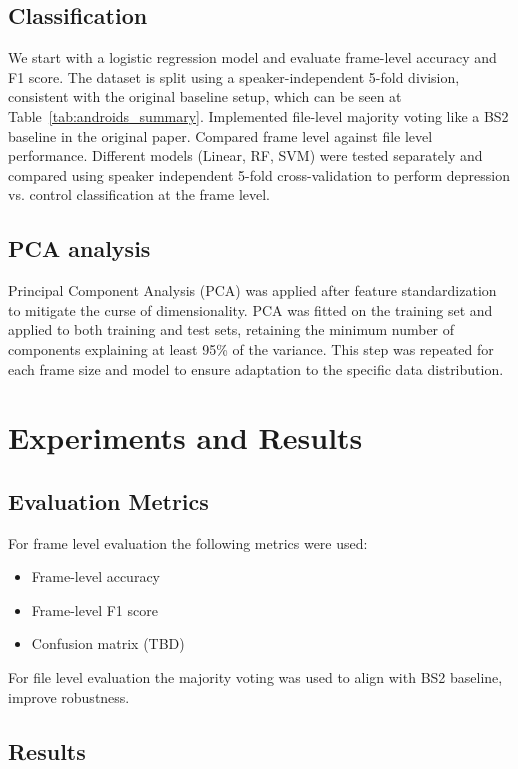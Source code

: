 \documentclass[conference]{IEEEtran}
\begin{document}
\subsection{Classification}
We start with a logistic regression model and evaluate frame-level accuracy and F1 score. 
The dataset is split using a speaker-independent 5-fold division, consistent with the original baseline setup, which can be seen at Table~\ref{tab:androids_summary}.
Implemented file-level majority voting like a BS2 baseline in the original paper.
Compared frame level against file level performance.
Different models (Linear, RF, SVM) were tested separately and compared using speaker independent 5-fold cross-validation 
to perform depression vs. control classification at the frame level.

\subsection{PCA analysis}

Principal Component Analysis (PCA) was applied after feature standardization to mitigate the curse of dimensionality. 
PCA was fitted on the training set and applied to both training and test sets, retaining the minimum number of components explaining at least 95\% of the variance. 
This step was repeated for each frame size and model to ensure adaptation to the specific data distribution.

\section{Experiments and Results}

\subsection{Evaluation Metrics}
For frame level evaluation the following metrics were used:
\begin{itemize}
    \item Frame-level accuracy
    \item Frame-level F1 score
    \item Confusion matrix (TBD)
\end{itemize}

For file level evaluation the majority voting was used to align with BS2 baseline, improve robustness.

\subsection{Results}
\end{document}
